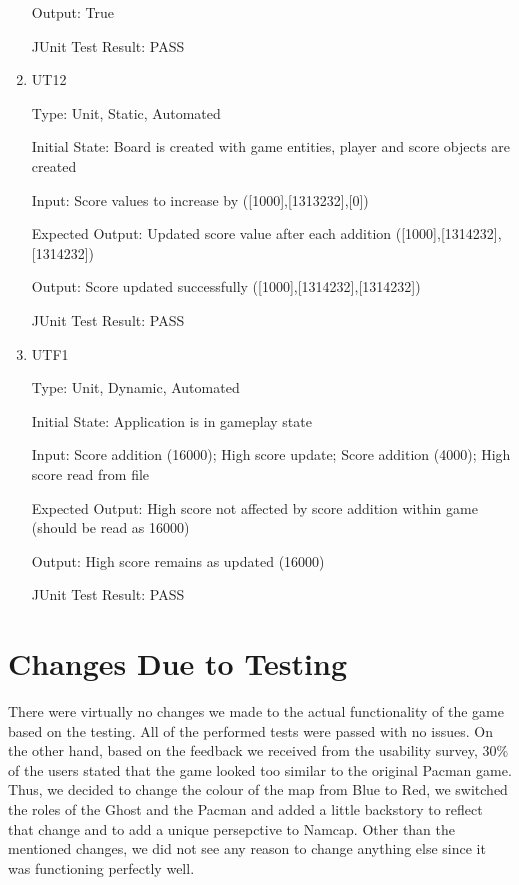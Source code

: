 \documentclass[12pt, titlepage]{article}
\begin{document}
\begin{enumerate}
Output: True

JUnit Test Result: PASS

\item{\label{ut12}{UT12}\\}

Type: Unit, Static, Automated
					
Initial State: Board is created with game entities, player and score objects are created
					
Input: Score values to increase by ([1000],[1313232],[0])
					
Expected Output: Updated score value after each addition ([1000],[1314232],[1314232])
					
Output: Score updated successfully ([1000],[1314232],[1314232])

JUnit Test Result: PASS

\item{\label{utf1}{UTF1}\\}

Type: Unit, Dynamic, Automated
					
Initial State: Application is in gameplay state
					
Input: Score addition (16000); High score update; Score addition (4000); High score read from file
					
Expected Output: High score not affected by score addition within game (should be read as 16000)
					
Output: High score remains as updated (16000)

JUnit Test Result: PASS

\end{enumerate}

\section{Changes Due to Testing}

There were virtually no changes we made to the actual functionality of the game based on the testing. All of the performed tests were passed with no issues. On the other hand, based on the feedback we received from the usability survey, 30\% of the users stated that the game looked too similar to the original Pacman game. Thus, we decided to change the colour of the map from Blue to Red, we switched the roles of the Ghost and the Pacman and added a little backstory to reflect that change and to add a unique persepctive to Namcap. Other than the mentioned changes, we did not see any reason to change anything else since it was functioning perfectly well.
\end{document}
